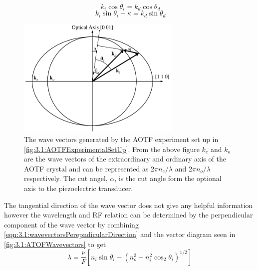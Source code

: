 \begin{equation}
    \ k_{i}\cos\theta_{i} = {k}_{d}\cos\theta_{d}
    \label{eqn:3.1:wavevectorsTangentalDirection}
\end{equation}
\begin{equation}
    \ k_{i}\sin\theta_{i} + \kappa = {k}_{d}\sin\theta_{d}
    \label{eqn:3.1:wavevectorsPerepndicularDirection}
\end{equation}

\begin{figure}
    \begin{center}
    \includegraphics[width=0.7\textwidth]{./Images/3-1-AOTFWavevectorWithRefraction.pdf}
    \caption[Wave Vectors Generated by an AOTF]{The wave vectors generated by the AOTF experiment set up in \autoref{fig:3.1:AOTFExperimentalSetUp}. From the above figure $k_{e}$ and $k_{o}$ are the wave vectors of the extraordinary and ordinary axis of the AOTF crystal and can be represented as $2\pi n_{e}/\lambda$ and $2\pi n_{o}/\lambda$ respectively. The cut angel, $\alpha$, is the cut angle form the optional axis to the piezoelectric transducer.}
    \label{fig:3.1:ATOFWavevectors}
    \end{center}
\end{figure}

The tangential direction of the wave vector does not give any helpful information however the wavelength and RF relation can be determined by the perpendicular component of the wave vector by combining \autoref{eqn:3.1:wavevectorsPerepndicularDirection} and the vector diagram seen in \autoref{fig:3.1:ATOFWavevectors} to get
\begin{equation}
    \lambda  = \frac{\nu}{F}[n_{i}\sin\theta_{i}-(n_{o}^{2}-n_{i}^{2}\cos_{2}\theta_{i})^{1/2}]
    \label{eqn:3.1:initialAOTFWavelengthDependance}
\end{equation}

